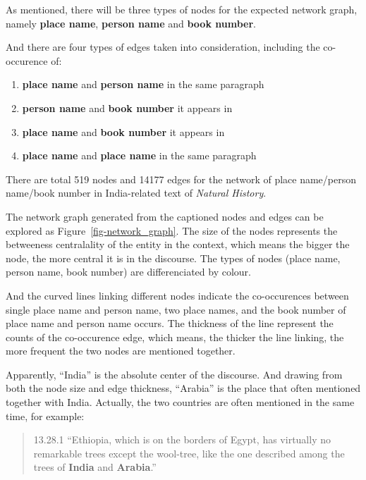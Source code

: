 \documentclass[
  12pt,
]{article}
\providecommand{\tightlist}{%
  \setlength{\itemsep}{0pt}\setlength{\parskip}{0pt}}\usepackage{longtable,booktabs,array}
\begin{document}
As mentioned, there will be three types of nodes for the expected
network graph, namely \textbf{place name}, \textbf{person name} and
\textbf{book number}.

And there are four types of edges taken into consideration, including
the co-occurence of:

\begin{enumerate}
\def\labelenumi{\arabic{enumi}.}
\tightlist
\item
  \textbf{place name} and \textbf{person name} in the same paragraph
\item
  \textbf{person name} and \textbf{book number} it appears in
\item
  \textbf{place name} and \textbf{book number} it appears in
\item
  \textbf{place name} and \textbf{place name} in the same paragraph
\end{enumerate}

There are total 519 nodes and 14177 edges for the network of place
name/person name/book number in India-related text of \emph{Natural
History}.

The network graph generated from the captioned nodes and edges can be
explored as Figure~\ref{fig-network_graph}. The size of the nodes
represents the betweeness centralality of the entity in the context,
which means the bigger the node, the more central it is in the
discourse. The types of nodes (place name, person name, book number) are
differenciated by colour.

And the curved lines linking different nodes indicate the co-occurences
between single place name and person name, two place names, and the book
number of place name and person name occurs. The thickness of the line
represent the counts of the co-occurence edge, which means, the thicker
the line linking, the more frequent the two nodes are mentioned
together.

Apparently, ``India'' is the absolute center of the discourse. And
drawing from both the node size and edge thickness, ``Arabia'' is the
place that often mentioned together with India. Actually, the two
countries are often mentioned in the same time, for example:

\begin{quote}
13.28.1 ``Ethiopia, which is on the borders of Egypt, has virtually no
remarkable trees except the wool-tree, like the one described among the
trees of \textbf{India} and \textbf{Arabia}.''
\end{quote}
\end{document}
